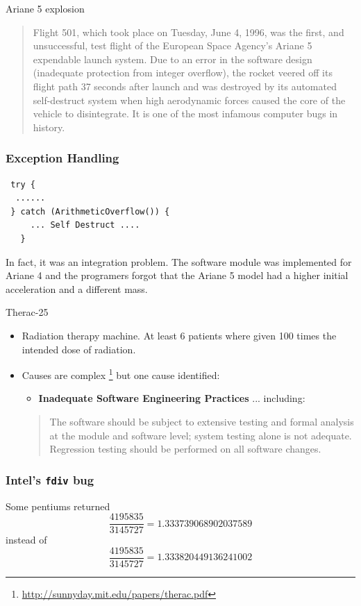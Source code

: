 \documentclass{beamer}
\begin{document}
\begin{frame}{Ariane 5 explosion}
  \begin{quote}
    Flight 501, which took place on Tuesday, June 4, 1996, was the
    first, and unsuccessful, test flight of the European Space
    Agency's Ariane 5 expendable launch system. Due to an error in the
    software design (inadequate protection from integer overflow), the
    rocket veered off its flight path 37 seconds after launch and was
    destroyed by its automated self-destruct system when high
    aerodynamic forces caused the core of the vehicle to
    disintegrate. It is one of the most infamous computer bugs in
    history.
  \end{quote}
\end{frame}
\begin{frame}[fragile]
  \frametitle{Exception Handling}
\begin{lstlisting}
 try {
  ......
 } catch (ArithmeticOverflow()) {
     ... Self Destruct .... 
   } 
\end{lstlisting}
In fact, it was an integration problem. The software module was implemented for
Ariane 4 and the programers  forgot that the Ariane 5 model had a higher initial
acceleration and a different mass.  
\end{frame}
\begin{frame}{Therac-25}
  \begin{itemize}
  \item  Radiation therapy machine. At least 6 patients where given
    100 times the intended dose of radiation. 
  \item Causes are complex
    \footnote{\url{http://sunnyday.mit.edu/papers/therac.pdf}} but one
    cause identified:
    \begin{itemize}
    \item      {\bf Inadequate Software Engineering Practices} ... including:
    \end{itemize}
    \begin{quote}
     The software should be subject to extensive testing and formal
     analysis at the module and software level; system testing alone
     is not adequate.  Regression testing should be performed on all
     software changes. 
    \end{quote}
  \end{itemize}  
\end{frame}
\begin{frame}
  \frametitle{Intel's {\tt fdiv} bug}
   
Some pentiums returned
\[
\frac{4195835}{3145727} = 1.333739068902037589
\]
instead of 
\[
\frac{4195835}{3145727} = 1.333820449136241002
\]

\end{frame}
\end{document}
